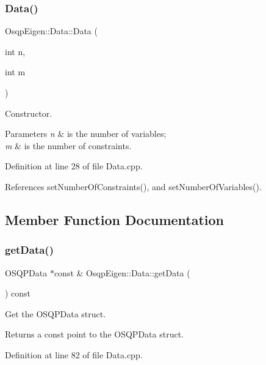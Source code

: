\subsubsection{\texorpdfstring{Data()}{Data()}}
{\footnotesize\ttfamily Osqp\+Eigen\+::\+Data\+::\+Data (\begin{DoxyParamCaption}\item[{int}]{n,  }\item[{int}]{m }\end{DoxyParamCaption})}



Constructor. 


\begin{DoxyParams}{Parameters}
{\em n} & is the number of variables; \\
\hline
{\em m} & is the number of constraints. \\
\hline
\end{DoxyParams}


Definition at line 28 of file Data.\+cpp.



References set\+Number\+Of\+Constraints(), and set\+Number\+Of\+Variables().



\subsection{Member Function Documentation}
\mbox{\label{classOsqpEigen_1_1Data_a4d9b55f6a91c0f83a178cc6927c2599b}} 
\subsubsection{\texorpdfstring{get\+Data()}{getData()}}
{\footnotesize\ttfamily O\+S\+Q\+P\+Data $\ast$const  \& Osqp\+Eigen\+::\+Data\+::get\+Data (\begin{DoxyParamCaption}{ }\end{DoxyParamCaption}) const}



Get the O\+S\+Q\+P\+Data struct. 

\begin{DoxyReturn}{Returns}
a const point to the O\+S\+Q\+P\+Data struct. 
\end{DoxyReturn}


Definition at line 82 of file Data.\+cpp.


